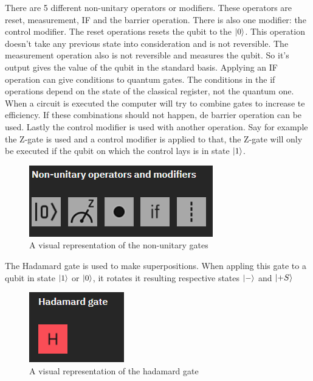 There are 5 different non-unitary operators or modifiers. These operators are reset, measurement, IF and the barrier operation. There is also one modifier: the control modifier.
The reset operations resets the qubit to the $\ket{0}$. This operation doesn't take any previous state into consideration and is not reversible.
The measurement operation also is not reversible and measures the qubit. So it's output gives the value of the qubit in the standard basis.
Applying an IF operation can give conditions to quantum gates. The conditions in the if operations depend on the state of the classical register, not the quantum one.
When a circuit is executed the computer will try to combine gates to increase te efficiency. If these combinations should not happen, de barrier operation can be used.
Lastly the control modifier is used with another operation. Say for example the Z-gate is used and a control modifier is applied to that, the Z-gate will only be executed if the qubit on which the control lays is in state $\ket{1}$.

\begin{figure} [h]
    \centering
    \includegraphics[width=\textwidth]{img/non-unitary-gates.PNG}
        \caption{A visual representation of the non-unitary gates}
        \label{fig:non-uni gates}
\end{figure}

The Hadamard gate is used to make superpositions. When appling this gate to a qubit in state $\ket{1}$ or $\ket{0}$, it rotates it resulting respective states $\ket{-}$ and $\ket{+S}$

\begin{figure} [h]
    \centering
    \includegraphics[width=\textwidth]{img/hadamard-gate.PNG}
        \caption{A visual representation of the hadamard gate}
        \label{fig:hadamard gates}
\end{figure}


